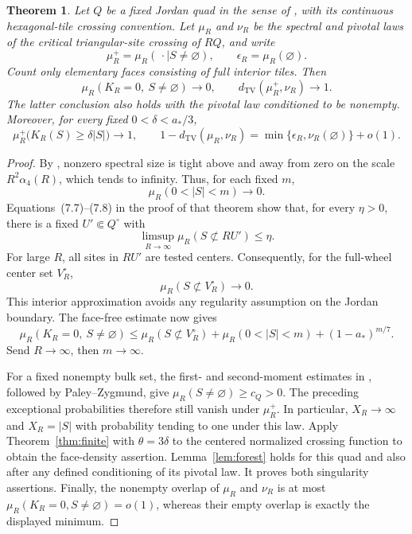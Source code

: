\documentclass[11pt]{amsart}
\newtheorem{theorem}{Theorem}[section]
\theoremstyle{remark}
\newcommand{\TV}{d_{\mathrm{TV}}}
\newcommand{\astar}{a_*}
\begin{document}
\begin{theorem}\label{thm:quads}
Let $Q$ be a fixed Jordan quad in the sense of \cite[Section~2.1]{GPS}, with its continuous hexagonal-tile crossing convention. Let $\mu_R$ and $\nu_R$ be the spectral and pivotal laws of the critical triangular-site crossing of $RQ$, and write
\[
 \mu_R^+=\mu_R(\,\cdot\mid S\ne\varnothing),\qquad
 \epsilon_R=\mu_R(\varnothing).
\]
Count only elementary faces consisting of full interior tiles. Then
\[
 \mu_R(K_R=0,\ S\ne\varnothing)\longrightarrow0,
 \qquad \TV(\mu_R^+,\nu_R)\longrightarrow1.
\]
The latter conclusion also holds with the pivotal law conditioned to be nonempty. Moreover, for every fixed $0<\delta<\astar/3$,
\[
 \mu_R^+\bigl(K_R(S)\ge\delta|S|\bigr)\longrightarrow1,
 \qquad
 1-\TV(\mu_R,\nu_R)
 =\min\{\epsilon_R,\nu_R(\varnothing)\}+o(1).
\]
\end{theorem}
\begin{proof}
By \cite[Theorem~7.4]{GPS}, nonzero spectral size is tight above and away from zero on the scale $R^2\alpha_4(R)$, which tends to infinity. Thus, for each fixed $m$,
\[
 \mu_R(0<|S|<m)\longrightarrow0.
\]
Equations~(7.7)--(7.8) in the proof of that theorem show that, for every $\eta>0$, there is a fixed $U'\Subset Q^\circ$ with
\[
 \limsup_{R\to\infty}\mu_R(S\not\subset RU')\le\eta.
\]
For large $R$, all sites in $RU'$ are tested centers. Consequently, for the full-wheel center set $V_R^\circ$,
\[
 \mu_R(S\not\subset V_R^\circ)\longrightarrow0.
\]
This interior approximation avoids any regularity assumption on the Jordan boundary. The face-free estimate now gives
\[
 \mu_R(K_R=0,\ S\ne\varnothing)
 \le\mu_R(S\not\subset V_R^\circ)
   +\mu_R(0<|S|<m)+(1-\astar)^{m/7}.
\]
Send $R\to\infty$, then $m\to\infty$.

For a fixed nonempty bulk set, the first- and second-moment estimates in \cite[Lemma~3.1]{GPS}, followed by Paley--Zygmund, give $\mu_R(S\ne\varnothing)\ge c_Q>0$. The preceding exceptional probabilities therefore still vanish under $\mu_R^+$. In particular, $X_R\to\infty$ and $X_R=|S|$ with probability tending to one under this law. Apply Theorem~\ref{thm:finite} with $\theta=3\delta$ to the centered normalized crossing function to obtain the face-density assertion. Lemma~\ref{lem:forest} holds for this quad and also after any defined conditioning of its pivotal law. It proves both singularity assertions. Finally, the nonempty overlap of $\mu_R$ and $\nu_R$ is at most $\mu_R(K_R=0,S\ne\varnothing)=o(1)$, whereas their empty overlap is exactly the displayed minimum.
\end{proof}
\end{document}
